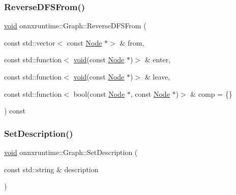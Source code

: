 \subsubsection{\texorpdfstring{Reverse\+D\+F\+S\+From()}{ReverseDFSFrom()}\hspace{0.1cm}{\footnotesize\ttfamily [2/2]}}
{\footnotesize\ttfamily \mbox{\hyperlink{mlasi_8h_a88f941d423cb2a819b70a1358982b1a6}{void}} onnxruntime\+::\+Graph\+::\+Reverse\+D\+F\+S\+From (\begin{DoxyParamCaption}\item[{const std\+::vector$<$ const \mbox{\hyperlink{classonnxruntime_1_1Node}{Node}} $\ast$$>$ \&}]{from,  }\item[{const std\+::function$<$ \mbox{\hyperlink{mlasi_8h_a88f941d423cb2a819b70a1358982b1a6}{void}}(const \mbox{\hyperlink{classonnxruntime_1_1Node}{Node}} $\ast$)$>$ \&}]{enter,  }\item[{const std\+::function$<$ \mbox{\hyperlink{mlasi_8h_a88f941d423cb2a819b70a1358982b1a6}{void}}(const \mbox{\hyperlink{classonnxruntime_1_1Node}{Node}} $\ast$)$>$ \&}]{leave,  }\item[{const std\+::function$<$ bool(const \mbox{\hyperlink{classonnxruntime_1_1Node}{Node}} $\ast$, const \mbox{\hyperlink{classonnxruntime_1_1Node}{Node}} $\ast$)$>$ \&}]{comp = {\ttfamily \{\}} }\end{DoxyParamCaption}) const}

\mbox{\label{classonnxruntime_1_1Graph_abf45d42d7f95a9147c7830d9c2cd25ae}} 
\subsubsection{\texorpdfstring{Set\+Description()}{SetDescription()}}
{\footnotesize\ttfamily \mbox{\hyperlink{mlasi_8h_a88f941d423cb2a819b70a1358982b1a6}{void}} onnxruntime\+::\+Graph\+::\+Set\+Description (\begin{DoxyParamCaption}\item[{const std\+::string \&}]{description }\end{DoxyParamCaption})}

\mbox{\label{classonnxruntime_1_1Graph_a086860d8eaa4f562e97d0ebbec731819}} 
